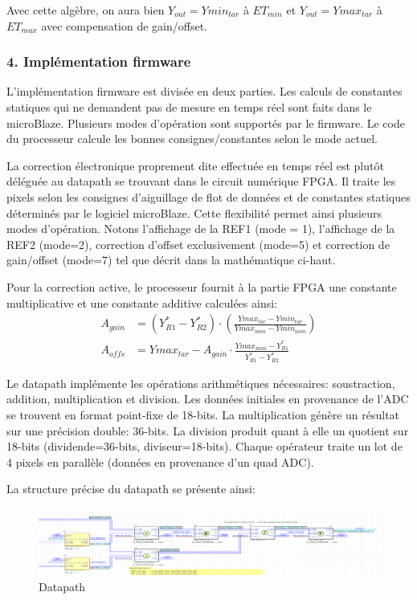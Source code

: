 \documentclass[11pt]{report}
\begin{document}
Avec cette algèbre, on aura bien $Y_{out}=Ymin_{tar}$ à $ET_{min}$ et $Y_{out}=Ymax_{tar}$ à $ET_{max}$ avec compensation de gain/offset.

\subsubsection{4. Implémentation firmware}
L'implémentation firmware est divisée en deux parties. Les calculs de constantes statiques qui ne demandent pas de mesure en temps réel sont faits dans le microBlaze. Plusieurs modes d'opération sont supportés par le firmware. Le code du processeur calcule les bonnes consignes/constantes selon le mode actuel.

La correction électronique proprement dite effectuée en temps réel est plutôt déléguée au datapath se trouvant dans le circuit numérique FPGA. Il traite les pixels selon les consignes d'aiguillage de flot de données et de constantes statiques déterminés par le logiciel microBlaze. Cette flexibilité permet ainsi plusieurs modes d'opération. Notons l'affichage de la REF1 (mode = 1), l'affichage de la REF2 (mode=2), correction d'offset exclusivement (mode=5) et correction de gain/offset (mode=7) tel que décrit dans la mathématique ci-haut.

Pour la correction active, le processeur fournit à la partie FPGA une constante multiplicative et une constante additive calculées ainsi:
\begin{align*}
A_{gain} &= (Y_{R1}^*-Y_{R2}^*) \cdot 
	    \left(\frac{Ymax_{tar}-Ymin_{tar}}{Ymax_{nom}-Ymin_{nom}}\right)\\
A_{offs} &= Ymax_{tar}-A_{gain}\cdot{}\frac{Ymax_{nom}-Y_{R1}^*}{Y_{R1}^*-Y_{R2}^*}\
\end{align*}

Le datapath implémente les opérations arithmétiques nécessaires: soustraction, addition, multiplication et division. Les données initiales en provenance de l'ADC se trouvent en format point-fixe de 18-bits. La multiplication génère un résultat sur une précision double: 36-bits. La division produit quant à elle un quotient sur 18-bits (dividende=36-bits, diviseur=18-bits). Chaque opérateur traite un lot de 4 pixels en parallèle (données en provenance d'un quad ADC).

La structure précise du datapath se présente ainsi:

\begin{figure}[ht]
  \centering
  \includegraphics[width=1.2\textwidth]{datapath}
  \caption{Datapath}
  \label{fig:datapath}
\end{figure}
\end{document}
